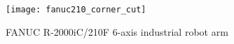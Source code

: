 \begin{figure}[H]
	\centering
	\texttt{[image: fanuc210\_corner\_cut]}
	\caption{FANUC R-2000iC/210F 6-axis industrial robot arm}
	\label{fig:fanuc210}
\end{figure}


	\cleardoublepage